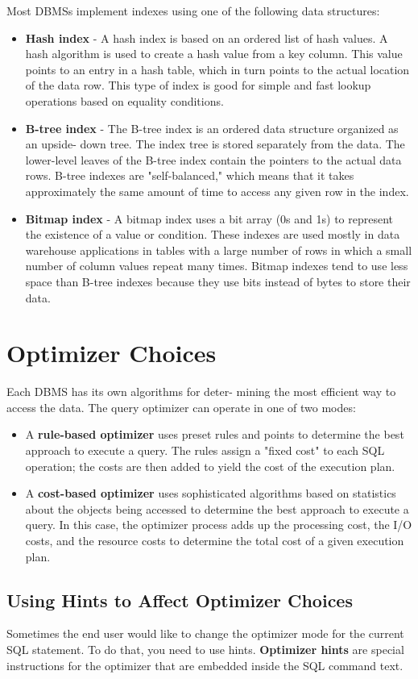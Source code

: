 \documentclass[a4paper, 11pt, titlepage]{report}
\begin{document}
Most DBMSs implement indexes using one of the following data structures:
\begin{itemize}
\item \textbf{Hash index} - A hash index is based on an ordered list of hash values. A hash algorithm
is used to create a hash value from a key column. This value points to an entry in a hash table, which in turn points to the actual location of the data row. This type of index is good for simple and fast lookup operations based on equality conditions.
\item \textbf{B-tree index} - The B-tree index is an ordered data structure organized as an upside-
down tree. The index tree is stored separately from the data. The lower-level leaves of the B-tree index contain the pointers to the actual data rows. B-tree indexes are "self-balanced," which means that it takes approximately the same amount of time to access any given row in the index.
\item \textbf{Bitmap index} - A bitmap index uses a bit array (0s and 1s) to represent the existence of a value or condition. These indexes are used mostly in data warehouse applications in tables with a large number of rows in which a small number of column values repeat many times. Bitmap indexes tend to use less space than B-tree indexes because they use bits instead of bytes to store their data.
\end{itemize}
\section{Optimizer Choices}
Each DBMS has its own algorithms for deter-
mining the most efficient way to access the data. The query optimizer can operate in one
of two modes:
\begin{itemize}
\item A \textbf{rule-based optimizer} uses preset rules and points to determine the best approach to execute a query. The rules assign a "fixed cost" to each SQL operation; the costs are then added to yield the cost of the execution plan.
\item A \textbf{cost-based optimizer} uses sophisticated algorithms based on statistics about the objects being accessed to determine the best approach to execute a query. In this case, the optimizer process adds up the processing cost, the I/O costs, and the resource costs to determine the total cost of a given execution plan.
\end{itemize}
\subsection{Using Hints to Affect Optimizer Choices}
Sometimes the end user would like to change the optimizer mode for the current SQL statement. To do that,
you need to use hints. \textbf{Optimizer hints} are special instructions for the optimizer that are
embedded inside the SQL command text.
\end{document}
